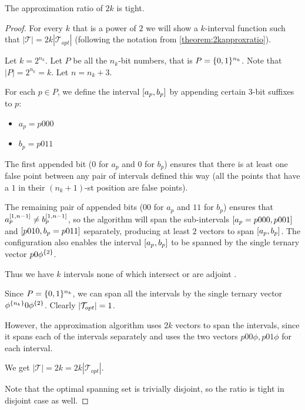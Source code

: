 \begin{theorem}
\label{theorem:2kapproxtight}
The approximation ratio of $2k$ is tight.
\end{theorem}

\begin{proof}
For every $k$ that is a power of $2$
we will show a $k$-interval function such that
$|\mathcal{T}| = 2k |\mathcal{T}_{opt}|$
(following the notation from
\autoref{theorem:2kapproxratio}).

Let $k = 2^{n_k}$.
Let $P$ be all the $n_k$-bit numbers,
that is $P = \{0, 1\}^{n_k}$.
Note that $|P| = 2^{n_k} = k$.
Let $n = n_k + 3$.

For each $p \in P$,
we define the interval $[a_p, b_p]$
by appending certain $3$-bit suffixes to $p$:

\begin{itemize}
\item $a_p = p 000$
\item $b_p = p 011$
\end{itemize}

The first appended bit
($0$ for $a_p$ and $0$ for $b_p$)
ensures that there is at least one false point
between any pair of intervals defined this way
(all the points that have a $1$ in their $(n_k + 1)$-st
position are false points).

The remaining pair of appended bits
($00$ for $a_p$ and $11$ for $b_p$)
ensures that
$a_p^{[1, n-1]} \neq b_p^{[1, n-1]}$,
so the algorithm will span the sub-intervals
$[a_p = p 000, p 001]$
and $[p 010, b_p = p 011]$ separately,
producing at least $2$ vectors to span
$[a_p, b_p]$.
The configuration also enables
the interval $[a_p, b_p]$
to be spanned by the single ternary vector
$p 0 \phi^{\{2\}}$.

Thus we have $k$ intervals
none of which intersect or are adjoint
.

Since $P = \{0, 1\}^{n_k}$,
we can span all the intervals by the single ternary vector
$\phi^{\{n_k\}} 0 \phi^{\{2\}}$.
Clearly $\lvert\mathcal{T}_{opt}\rvert = 1$.

However,
the approximation algorithm uses $2k$ vectors to span
the intervals,
since it spans each of the intervals separately
and uses the two vectors
$p 0 0 \phi, p 0 1 \phi$
for each interval.

We get
$|\mathcal{T}| = 2k = 2k |\mathcal{T}_{opt}|$.

Note that the optimal spanning set is trivially disjoint,
so the ratio is tight in disjoint case as well.
\end{proof}
